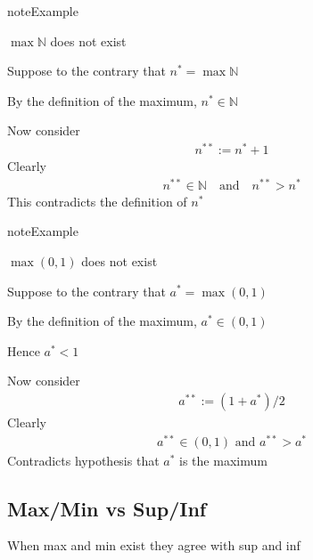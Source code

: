 \documentclass[letterpaper,10pt,english]{jupyterBook}
\begin{document}
\begin{sphinxadmonition}{note}{Example}

\sphinxAtStartPar
\(\max \mathbb{N}\) does not exist
\end{sphinxadmonition}

\sphinxAtStartPar
Suppose to the contrary that \(n^* = \max \mathbb{N}\)

\sphinxAtStartPar
By the definition of the maximum, \(n^* \in \mathbb{N}\)

\sphinxAtStartPar
Now consider
\begin{equation*}
\begin{split}
%
n^{**} := n^* + 1
%
\end{split}
\end{equation*}
\sphinxAtStartPar
Clearly
\begin{equation*}
\begin{split}
%
n^{**} \in \mathbb{N}
\quad \text{and} \quad 
n^{**} > n^*
%
\end{split}
\end{equation*}
\sphinxAtStartPar
This contradicts the definition of \(n^*\)

\begin{sphinxadmonition}{note}{Example}

\sphinxAtStartPar
\(\max (0, 1)\) does not exist
\end{sphinxadmonition}

\sphinxAtStartPar
Suppose to the contrary that \(a^* = \max (0, 1)\)

\sphinxAtStartPar
By the definition of the maximum, \(a^* \in (0, 1)\)

\sphinxAtStartPar
Hence \(a^* < 1\)

\sphinxAtStartPar
Now consider
\begin{equation*}
\begin{split}
%
a^{**} := (1 + a^*)/2
%
\end{split}
\end{equation*}
\sphinxAtStartPar
Clearly
\begin{equation*}
\begin{split}
%
a^{**} \in (0, 1) \text{ and } a^{**} > a^*
%
\end{split}
\end{equation*}
\sphinxAtStartPar
Contradicts hypothesis that \(a^*\) is the maximum


\subsection{Max/Min vs Sup/Inf}
\label{\detokenize{06.optimization_fundamentals:max-min-vs-sup-inf}}
\sphinxAtStartPar
When max and min exist they agree with sup and inf
\end{document}
